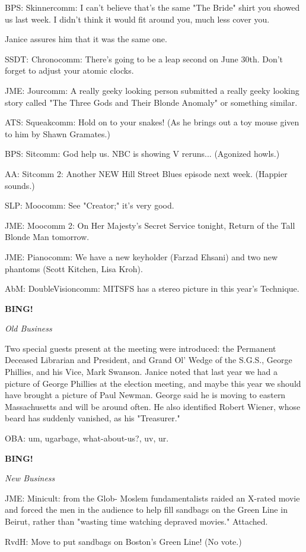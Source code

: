 \documentclass[12pt]{article}
\newcommand{\bing}{{\bf BING!} }
\newcommand{\goto}[1]{\bing \vskip 12pt \centerline{{\em{#1}}}}
\begin{document}
BPS: Skinnercomm: I can't believe that's the same "The Bride" shirt you showed us last week. I didn't think it would fit around you, much less cover you.

Janice assures him that it was the same one.

SSDT: Chronocomm: There's going to be a leap second on June 30th. Don't forget to adjust your atomic clocks.

JME: Jourcomm: A really geeky looking person submitted a really geeky looking story called "The Three Gods and Their Blonde Anomaly" or something similar.

ATS: Squeakcomm: Hold on to your snakes! (As he brings out a toy mouse given to him by Shawn Gramates.)

BPS: Sitcomm: God help us. NBC is showing V reruns... (Agonized howls.)

AA: Sitcomm 2: Another NEW Hill Street Blues episode next week. (Happier sounds.)

SLP: Moocomm: See "Creator;" it's very good.

JME: Moocomm 2: On Her Majesty's Secret Service tonight, Return of the Tall Blonde Man tomorrow.

JME: Pianocomm: We have a new keyholder (Farzad Ehsani) and two new phantoms (Scott Kitchen, Lisa Kroh).

AbM: DoubleVisioncomm: MITSFS has a stereo picture in this year's Technique.

\goto{Old Business}

Two special guests present at the meeting were introduced: the Permanent Deceased Librarian and President, and Grand Ol' Wedge of the S.G.S., George Phillies, and his Vice, Mark Swanson. Janice noted that last year we had a picture of George Phillies at the election meeting, and maybe this year we should have brought a picture of Paul Newman. George said he is moving to eastern Massachusetts and will be around often. He also identified Robert Wiener, whose beard has suddenly vanished, as his "Treasurer."

OBA: um, ugarbage, what-about-us?, uv, ur.

\goto{New Business}

JME: Minicult: from the Glob- Moslem fundamentalists raided an X-rated movie and forced the men in the audience to help fill sandbags on the Green Line in Beirut, rather than "wasting time watching depraved movies." Attached.

RvdH: Move to put sandbags on Boston's Green Line! (No vote.)
\end{document}
